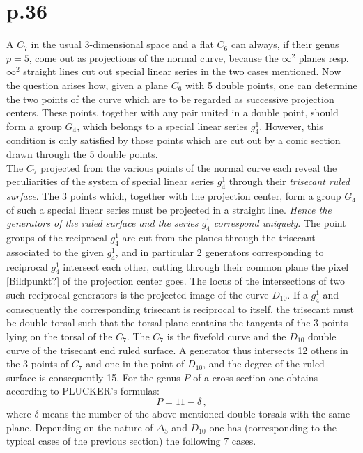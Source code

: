 \documentclass[leqno]{article}
\begin{document}
\section{p.36}
A $C_7$ in the usual 3-dimensional space and a flat $C_6$ can always, if their genus $p=5$, come out as projections of the normal curve, because the $\infty^2$ planes resp. $\infty^2$ straight lines cut out special linear series in the two cases mentioned. Now the question arises how, given a plane $C_6$ with 5 double points, one can determine the two points of the curve which are to be regarded as successive projection centers. These points, together with any pair united in a double point, should form a group $G_4$, which belongs to a special linear series $g_4^1$. However, this condition is only satisfied by those points which are cut out by a conic section drawn through the 5 double points. \\
The $C_7$ projected from the various points of the normal curve each reveal the peculiarities of the system of special linear series $g_4^1$ through their \textit{trisecant ruled surface}. The 3 points which, together with the projection center, form a group $G_4$ of such a special linear series must be projected in a straight line. \textit{Hence the generators of the ruled surface and the series $g_4^1$ correspond uniquely.} The point groups of the reciprocal $g_4^1$ are cut from the planes through the trisecant associated to the given $g_4^1$, and in particular 2 generators corresponding to reciprocal $g_4^1$ intersect each other, cutting through their common plane the pixel [Bildpunkt?] of the projection center goes. The locus of the intersections of two such reciprocal generators is the projected image of the curve $D_{10}$. If a $g_4^1$ and consequently the corresponding trisecant is reciprocal to itself, the trisecant must be double torsal such that the torsal plane contains the tangents of the 3 points lying on the torsal of the $C_7$.
The $C_7$ is the fivefold curve and the $D_{10}$ double curve of the trisecant end ruled surface. A generator thus intersects 12 others in the 3 points of $C_7$ and one in the point of $D_{10}$, and the degree of the ruled surface is consequently 15. For the genus $P$ of a cross-section one obtains according to PLUCKER's formulas: 
\[
P=11-\delta \, , 
\]
where $\delta$ means the number of the above-mentioned double torsals with the same plane. Depending on the nature of $\Delta_5$ and $D_{10}$ one has (corresponding to the typical cases of the previous section) the following 7 cases.
\end{document}
